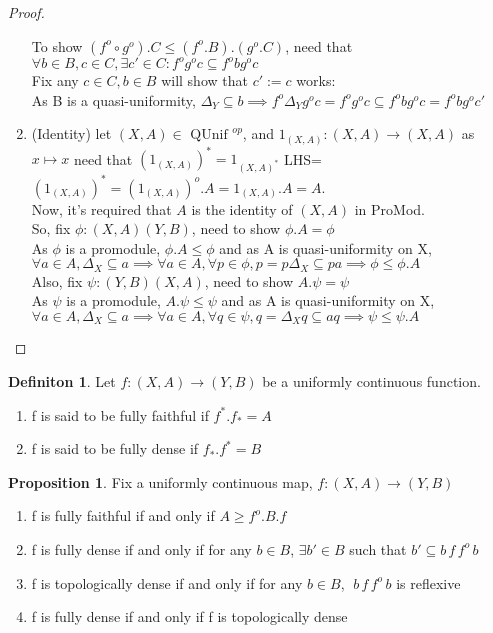 \documentclass[18pt,a4paper]{article}
\makeatletter
\theoremstyle{definition}
\newtheorem{definition}{Definiton}[section]
\newtheorem{proop}{Proposition}[section]
\newcommand{\carrow}{}%
\DeclareRobustCommand{\carrow}{%
	\mathrel{\vphantom{\rightarrow}\mathpalette\circle@arrow\relax}%
}
\newcommand{\circle@arrow}[2]{%
	\m@th
	\ooalign{%
		\hidewidth$#1\circ\mkern1mu$\hidewidth\cr
	$#1\longrightarrow$\cr}%
}
\makeatother
\begin{document}
\begin{proof}
\begin{enumerate}[label=(\roman*)]
					To show $(f^o \circ g^o).C\leq(f^o .B).(g^o .C)$, need that
					$\forall b \in B, c \in C, \exists c' \in C: f^o g^o c \subseteq f^obg^oc $
					\\Fix any $c\in C, b\in B$ will show that $c':=c$ works:\\
					As B is a quasi-uniformity, $\Delta_Y \subseteq b\implies f^o \Delta_Y
					g^o c=f^o g^o c \subseteq f^o b	g^o c=f^o b g^o c'$
				\item(Identity) let $(X,A)\in \text{ QUnif }^{op} $, and
					$1_{(X,A)}:(X,A)\to(X,A)$ as $x\mapsto x$ need that
					$(1_{(X,A)})^*=1_{(X,A)^*}$
					LHS=$(1_{(X,A)})^*=(1_{(X,A)})^o.A=1_{(X,A)}.A=A$.
					\\Now, it's required that $A$ is the identity of $(X,A)$ in ProMod.\\
					So, fix $\phi:(X,A) \carrow (Y,B)$, need to show $\phi.A=\phi$\\
					As $\phi$ is a promodule, $\phi.A \leq \phi$ and as A is quasi-uniformity on X,\\
					$\forall a\in A, \Delta_X \subseteq a \implies
					\forall a \in A, \forall p \in \phi, p=p\Delta_X\subseteq pa \implies
					\phi \leq \phi.A$\\
					Also, fix $\psi:(Y,B) \carrow (X,A)$, need to show $A.\psi=\psi$\\
					As $\psi$ is a promodule, $A.\psi \leq \psi$ and as A is quasi-uniformity on X,\\
					$\forall a\in A, \Delta_X \subseteq a \implies
					\forall a \in A, \forall q \in \psi, q=\Delta_X q \subseteq aq \implies
					\psi \leq \psi.A$
			\end{enumerate}



		\end{proof}
		\begin{definition} %
			Let $f:(X,A) \to (Y,B)$ be a uniformly continuous function.
			\begin{enumerate}[label=\Roman*]
				\item f is said to be fully faithful if	$f^* .f_*=A $
				\item f is said to be fully dense if $f_* .f^*=B $
			\end{enumerate}
		\end{definition}
		\begin{proop}
			Fix a uniformly continuous map, $f:(X,A) \rightarrow (Y,B)$
			\begin{enumerate}[label=(\alph*)]
				\item f is fully faithful if and only if $A\geq f^o.B.f$
				\item f is fully dense if and only if for any $b\in B$, $\exists b' \in B$
					such that $b' \subseteq b\,f\,f^o \,b$
				\item f is topologically dense if and only if for any $b\in B$,
					$\; b \, f\, f^o\,b$ is reflexive
				\item f is fully dense if and only if f is topologically dense
			\end{enumerate}
		\end{proop}
\end{document}
